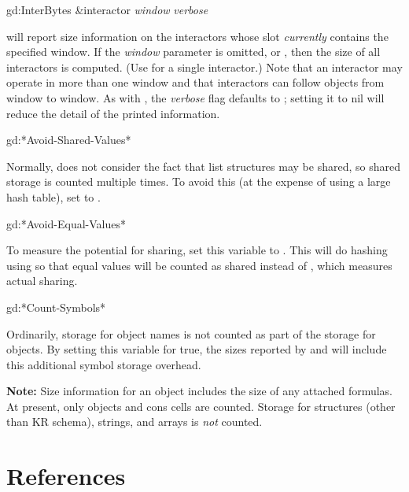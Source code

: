 \begin{programexample}
gd:InterBytes \&interactor {\it window} {\it verbose}\value{function}
\end{programexample}
will report size information on the interactors whose 
slot {\it currently}
contains the specified window.  If the {\it window} parameter is
omitted,  or , then the size of all interactors is
computed.  (Use  for a single interactor.)  Note that
an interactor may operate in more than one window and that interactors
can follow objects from window to window.  As with
, the {\it verbose} flag defaults to ; setting
it to nil will reduce the detail of the printed information.

\begin{programexample}
gd:*Avoid-Shared-Values*\value{variable}
\end{programexample}
Normally,  does not consider the fact that list
structures may be shared, so shared storage is counted multiple
times.  To avoid this (at the expense of using a large hash table),
set  to .

\begin{programexample}
gd:*Avoid-Equal-Values*\value{variable}
\end{programexample}
To measure the potential for sharing, set this variable to .
This will do hashing using  so that equal values will
be counted as shared instead of , which
measures actual sharing.

\begin{programexample}
gd:*Count-Symbols*\value{variable}
\end{programexample}
Ordinarily, storage for object names is not counted as part of the
storage for objects.  By setting this variable for true, the
sizes reported by  and  will include
this additional symbol storage overhead.

{\bf Note:} Size information for an object includes the size of
any attached formulas.  At present, only objects and cons cells
are counted.  Storage for structures (other than KR
schema), strings, and arrays is {\it not} counted.


\chapter*{References}

